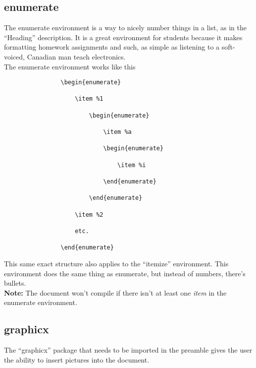 \documentclass[11pt,letterpaper,twoside,titlepage]{article}
\begin{document}
		\subsection{enumerate}
		
			The enumerate environment is a way to nicely number things in a list, as in the ``Heading'' description.  It is a great environment for students because it makes formatting homework assignments and such, as simple as listening to a soft-voiced, Canadian man teach electronics. \\
			
			The enumerate environment works like this
			
			\begin{verbatim}
				\begin{enumerate}
				
					\item %1
					
						\begin{enumerate}
						
							\item %a
							
							\begin{enumerate}
							
								\item %i
							
							\end{enumerate}
						
						\end{enumerate}
					
					\item %2
					
					etc.
					
				\end{enumerate}
			\end{verbatim}
			
			This same exact structure also applies to the ``itemize'' environment.  This environment does the same thing as enumerate, but instead of numbers, there's bullets. \\
			
			\textbf{Note:} The document won't compile if there isn't at least one \emph{item} in the enumerate environment.
					
		\subsection{graphicx}
		
			The ``graphicx'' package that needs to be imported in the preamble gives the user the ability to insert pictures into the document. \\
			
\end{document}
